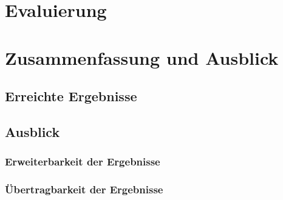 \documentclass[oneside]{ausarbeitung}
\begin{document}
\chapter{Evaluierung}
\label{cha:evaluation}


\chapter{Zusammenfassung und Ausblick}
\label{cha:zusammenfassung}

\section{Erreichte Ergebnisse}
\label{sec:ergebnisse}


\section{Ausblick}
\label{sec:ausblick}

\subsection{Erweiterbarkeit der Ergebnisse}
\label{sub:erweiterbarkeit}

\subsection{Übertragbarkeit der Ergebnisse}
\label{sub:uebertragbarkeit}


\printbibliography[title={Referenzen}]

\appendix

\end{document}
